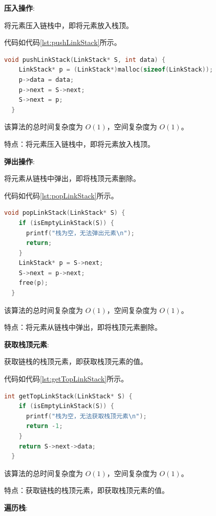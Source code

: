 \documentclass[lang=cn,newtx,10pt,scheme=chinese]{../elegantbook}
\begin{document}
\textbf{压入操作}:

将元素压入链栈中，即将元素放入栈顶。

代码如代码\ref{lst:pushLinkStack}所示。

\begin{lstlisting}[language=C++, caption={压入链栈示例代码}, label={lst:pushLinkStack}]
  void pushLinkStack(LinkStack* S, int data) {
    LinkStack* p = (LinkStack*)malloc(sizeof(LinkStack));
    p->data = data;
    p->next = S->next;
    S->next = p;
  }

\end{lstlisting}

该算法的总时间复杂度为 $O(1)$，空间复杂度为 $O(1)$。

特点：将元素压入链栈中，即将元素放入栈顶。

\textbf{弹出操作}:

将元素从链栈中弹出，即将栈顶元素删除。

代码如代码\ref{lst:popLinkStack}所示。

\begin{lstlisting}[language=C++, caption={弹出链栈示例代码}, label={lst:popLinkStack}]
  void popLinkStack(LinkStack* S) {
    if (isEmptyLinkStack(S)) {
      printf("栈为空，无法弹出元素\n");
      return;
    }
    LinkStack* p = S->next;
    S->next = p->next;
    free(p);
  }

\end{lstlisting}

该算法的总时间复杂度为 $O(1)$，空间复杂度为 $O(1)$。

特点：将元素从链栈中弹出，即将栈顶元素删除。

\textbf{获取栈顶元素}:

获取链栈的栈顶元素，即获取栈顶元素的值。

代码如代码\ref{lst:getTopLinkStack}所示。

\begin{lstlisting}[language=C++, caption={获取链栈的栈顶元素示例代码}, label={lst:getTopLinkStack}]
  int getTopLinkStack(LinkStack* S) {
    if (isEmptyLinkStack(S)) {
      printf("栈为空，无法获取栈顶元素\n");
      return -1;
    }
    return S->next->data;
  }

\end{lstlisting}

该算法的总时间复杂度为 $O(1)$，空间复杂度为 $O(1)$。

特点：获取链栈的栈顶元素，即获取栈顶元素的值。

\textbf{遍历栈}:
\end{document}
